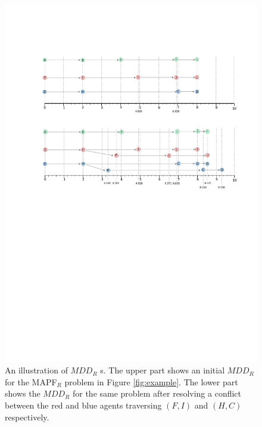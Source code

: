 \documentclass[review]{elsarticle}
\newcommand{\mddr}{\ensuremath{MDD_R}\xspace}
\newcommand{\mapfr}{\ac{MAPF}$_R$\xspace}
\begin{document}
\begin{figure}
    \centering
    \includegraphics[trim={3.0cm 14.0cm 1.0cm 4.3cm},clip,width=\columnwidth]{fig-running_makespan.pdf}
    \caption{An illustration of \mddr s. 
    The upper part shows an initial \mddr for the \mapfr problem in Figure \ref{fig:example}. The lower part shows the \mddr for the same problem after resolving a conflict between the red and blue agents traversing $(F,I)$ and $(H,C)$ respectively.}
    \label{fig:mddr}
\end{figure}
\end{document}
